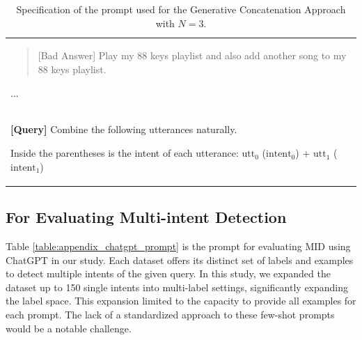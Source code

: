 \begin{table}
\begin{tabular}{>{\raggedright\arraybackslash}p{15cm}}
\begin{quote}
        {[Bad Answer]} Play my 88 keys playlist and also add another song to my 88 keys playlist. 
        
        \end{quote}
        ... \\
        
        \arrayrulecolor{lightgray}\midrule\arrayrulecolor{black}
        
        \textbf{[Query]} Combine the following utterances naturally.
        
        Inside the parentheses is the intent of each utterance: $\mathrm{utt_0}$ ({$\mathrm{intent_0}$}) + $\mathrm{utt_1}$ ({$\mathrm{intent_1}$}) \\
        
        \bottomrule
    \end{tabular}
    
    \caption{Specification of the prompt used for the Generative Concatenation Approach with $N=3$.}
    \label{table:appendix_concatenation_prompt}
\end{table}


\subsection{For Evaluating Multi-intent Detection}
\label{subsec:prompt_evaluate}
Table \ref{table:appendix_chatgpt_prompt} is the prompt for evaluating MID using ChatGPT in our study. Each dataset offers its distinct set of labels and examples to detect multiple intents of the given query.
In this study, we expanded the dataset up to 150 single intents into multi-label settings, significantly expanding the label space.
This expansion limited to the capacity to provide all examples for each prompt. 
The lack of a standardized approach to these few-shot prompts would be a notable challenge.

